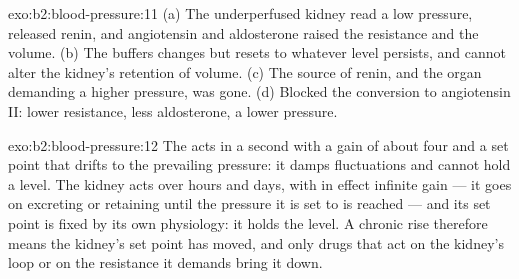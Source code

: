 \begin{solution}{exo:b2:blood-pressure:11}
(a) The underperfused kidney read a low pressure, released renin,
and angiotensin and aldosterone raised the resistance and the
volume. (b) The  buffers changes but resets to whatever
level persists, and cannot alter the kidney's retention of volume.
(c) The source of renin, and the organ demanding a higher pressure,
was gone. (d) Blocked the conversion to angiotensin II: lower
resistance, less aldosterone, a lower pressure.
\end{solution}

\begin{solution}{exo:b2:blood-pressure:12}
The  acts in a second with a gain of about four and a set
point that drifts to the prevailing pressure: it damps fluctuations
and cannot hold a level. The kidney acts over hours and days, with
in effect infinite gain --- it goes on excreting or retaining until
the pressure it is set to is reached --- and its set point is fixed
by its own physiology: it holds the level. A chronic rise therefore
means the kidney's set point has moved, and only drugs that act on
the kidney's loop or on the resistance it demands bring it down.
\end{solution}

